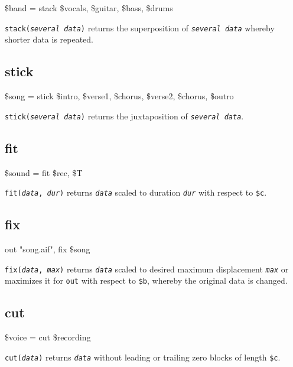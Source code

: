 \documentclass[a4paper, 10pt]{article}
\begin{document}
	\begin{center} \ttfamily
		\$band = stack \$vocals, \$guitar, \$bass, \$drums
	\end{center}
	\texttt{stack(\textit{several data})} returns the superposition of \texttt{\textit{several data}} whereby shorter data is repeated.

	\subsection{stick}

	\begin{center} \ttfamily
		\$song = stick \$intro, \$verse1, \$chorus, \$verse2, \$chorus, \$outro
	\end{center}
	\texttt{stick(\textit{several data})} returns the juxtaposition of \texttt{\textit{several data}}.

	\subsection{fit}

	\begin{center} \ttfamily
		\$sound = fit \$rec, \$T
	\end{center}
	\texttt{fit(\textit{data}, \textit{dur})} returns \texttt{\textit{data}} scaled to duration \texttt{\textit{dur}} with respect to \texttt{\$c}.

	\subsection{fix}

	\begin{center} \ttfamily
		out "song.aif", fix \$song
	\end{center}
	\texttt{fix(\textit{data}, \textit{max})} returns \texttt{\textit{data}} scaled to desired maximum displacement \texttt{\textit{max}} or maximizes it for \texttt{out} with respect to \texttt{\$b}, whereby the original data is changed.

	\subsection{cut}

	\begin{center} \ttfamily
		\$voice = cut \$recording
	\end{center}
	\texttt{cut(\textit{data})} returns \texttt{\textit{data}} without leading or trailing zero blocks of length \texttt{\$c}.
\end{document}
